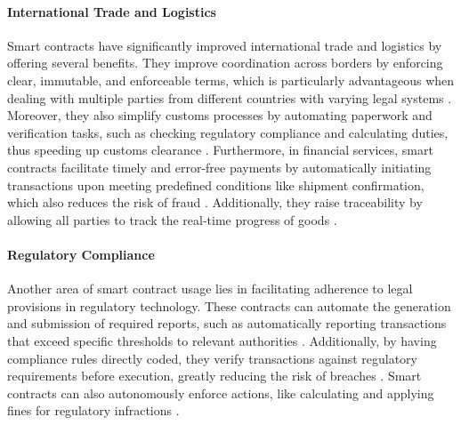 
\paragraph{International Trade and Logistics}

Smart contracts have significantly improved international trade and logistics by offering several benefits. They improve coordination across borders by enforcing clear, immutable, and enforceable terms, which is particularly advantageous when dealing with multiple parties from different countries with varying legal systems \cite{AlqarniEtAl2023, MagazzeniEtAl2017}. Moreover, they also simplify customs processes by automating paperwork and verification tasks, such as checking regulatory compliance and calculating duties, thus speeding up customs clearance \cite{Law2017, AlqarniEtAl2023}. Furthermore, in financial services, smart contracts facilitate timely and error-free payments by automatically initiating transactions upon meeting predefined conditions like shipment confirmation, which also reduces the risk of fraud \cite{AlqarniEtAl2023, MagazzeniEtAl2017}. Additionally, they raise traceability by allowing all parties to track the real-time progress of goods \cite{AlqarniEtAl2023}.

\paragraph{Regulatory Compliance}

Another area of smart contract usage lies in facilitating adherence to legal provisions in regulatory technology. These contracts can automate the generation and submission of required reports, such as automatically reporting transactions that exceed specific thresholds to relevant authorities \cite{BarberisEtAl2019}. Additionally, by having compliance rules directly coded, they verify transactions against regulatory requirements before execution, greatly reducing the risk of breaches \cite{BarberisEtAl2019}. Smart contracts can also autonomously enforce actions, like calculating and applying fines for regulatory infractions \cite{MagazzeniEtAl2017}.

